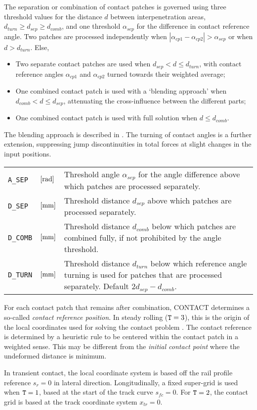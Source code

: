 \documentclass[12pt]{report}
\newenvironment{inputvars}{\vspace{0.4\baselineskip}%

\begin{tabular}{>{\raggedright}p{22mm}p{19mm}p{113mm}}}{
\end{tabular}

}
\newcommand{\inpvar}[3]{{\small\tt #1} & $#2$ & #3 \\[1ex]}
\begin{document}
The separation or combination of contact patches is governed using three
threshold values for the distance $d$ between interpenetration areas,
$d_{turn}\ge d_{sep}\ge d_{comb}$, and one threshold $\alpha_{sep}$ for
the difference in contact reference angle. Two patches are processed
independently when $|\alpha_{cp1}- \alpha_{cp2}| > \alpha_{sep}$ or when
$d > d_{turn}$. Else,
\begin{itemize}
\item Two separate contact patches are used when $d_{sep} < d\le
        d_{turn}$, with contact reference angles $\alpha_{cp1}$ and
        $\alpha_{cp2}$ turned towards their weighted average;
\item One combined contact patch is used with a `blending approach'
        when $d_{comb}< d\le d_{sep}$, attenuating the cross-influence
        between the different parts;
\item One combined contact patch is used with full solution when $d\le
        d_{comb}$.
\end{itemize}
The blending approach is described in \cite{Vollebregt2020b-wrgeom,
Vollebregt2020c-distr-force}. The turning of contact angles is a further
extension, suppressing jump discontinuities in total forces at slight
changes in the input positions.
\begin{inputvars}
\inpvar{A\_SEP}{\bunit{rad}}{Threshold angle $\alpha_{sep}$ for the angle
        difference above which patches are processed separately.}
\inpvar{D\_SEP}{\bunit{mm}}{Threshold distance $d_{sep}$ above which patches
        are processed separately.}
\inpvar{D\_COMB}{\bunit{mm}}{Threshold distance $d_{comb}$ below which
        patches are combined fully, if not prohibited by the angle threshold.}
\inpvar{D\_TURN}{\bunit{mm}}{Threshold distance $d_{turn}$ below which
        reference angle turning is used for patches that are processed
        separately. Default $2 d_{sep}-d_{comb}$.}
\end{inputvars}
For each contact patch that remains after combination, CONTACT determines a
so-called {\em contact reference position\/}. In steady rolling (${\tt
T}=3$), this is the origin of the local coordinates used for solving the
contact problem \cite{Vollebregt2020b-wrgeom}. The contact reference is
determined by a heuristic rule to be centered within the contact patch in
a weighted sense. This may be different from the {\em initial contact
point\/} where the undeformed distance is minimum. 

In transient contact, the local coordinate system is based off the rail
profile reference $s_r=0$ in lateral direction. Longitudinally, a fixed
super-grid is used when ${\tt T}=1$, based at the start of the track curve
$s_{fc}=0$. For ${\tt T}=2$, the contact grid is based at the track
coordinate system $x_{tr}=0$.
\end{document}
